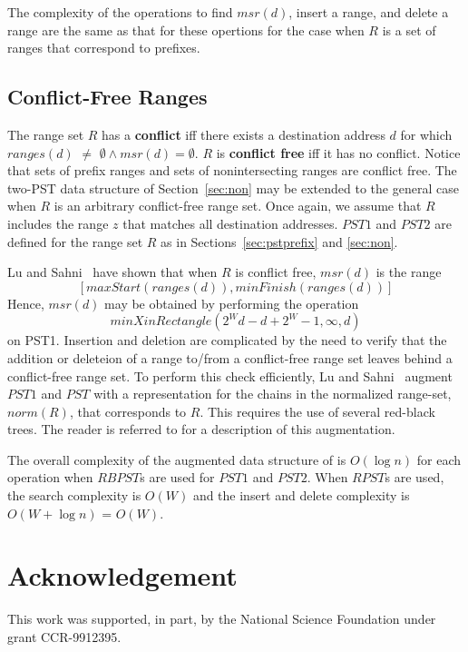 The complexity of the operations to find $msr(d)$, insert a range,
and delete a range are the same as that for these opertions
for the case when $R$ is a set of ranges that correspond to prefixes.

\subsection{Conflict-Free Ranges}\label{sec:cfranges}
The range set $R$
has a {\bf conflict} iff there exists a destination address $d$ for which
$ranges(d)$ $\neq$ $\emptyset \wedge msr(d) = \emptyset$.
$R$ is {\bf conflict free} iff it has no conflict.
Notice that sets of prefix ranges and sets of nonintersecting ranges
are conflict free.
The two-PST data structure of Section~\ref{sec:non} may be extended
to the general case when $R$ is an arbitrary conflict-free range set.
Once again, we assume that
$R$ includes the range $z$ that matches all destination addresses.
$PST1$ and $PST2$ are defined for the range set $R$ as in
Sections~\ref{sec:pstprefix} and \ref{sec:non}.

Lu and Sahni~\cite{lu} have shown that when $R$ is conflict free, $msr(d)$ is
the range
$$[maxStart(ranges(d)), minFinish(ranges(d))]$$
Hence, $msr(d)$ may be obtained by performing the operation
$$minXinRectangle(2^Wd - d + 2^W - 1, \infty, d)$$
on PST1.
Insertion and deletion are complicated by the need to verify that the addition
or deleteion of a range to/from a conflict-free range set leaves behind
a conflict-free range set. To perform this check efficiently,
Lu and Sahni~\cite{lu} augment $PST1$ and
$PST$ with a representation for the chains in the normalized
range-set, $norm(R)$, that corresponds to $R$. This requires
the use of several red-black trees.
The reader is referred to \cite{lu} for a description of this
augmentation.


The overall complexity of the augmented data structure of \cite{lu} is
$O(\log n)$ for each operation when $RBPST$s are used for $PST1$ and $PST2$.
When $RPST$s are used, the search complexity is $O(W)$ and the insert
and delete complexity is $O(W + \log n)$ = $O(W)$.



\section*{Acknowledgement}
This work was supported,
in part, by the National Science Foundation under
grant CCR-9912395.

